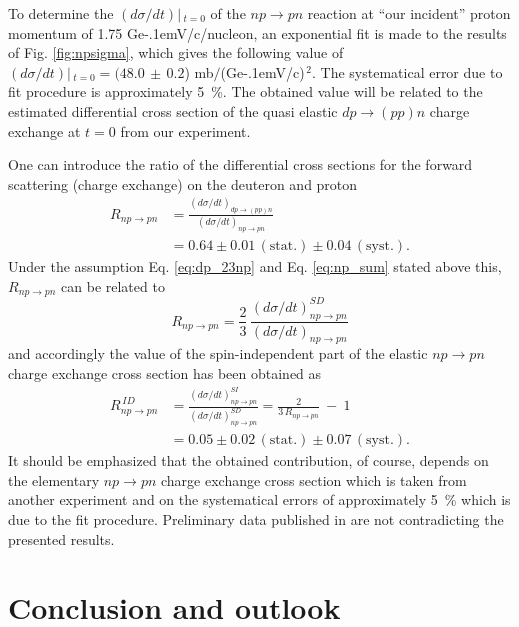 \documentclass[twocolumn,epjc3]{svjour3}
\newcommand{\np}     {\ensuremath{np \rightarrow pn}\xspace}
\newcommand{\dpchex} {\ensuremath{dp \rightarrow (pp)n}\xspace}
\newcommand{\GeVc}   {Ge\kern-.1emV/c\xspace}
\begin{document}
To determine the $(d\sigma/dt)|\,_{t=0}$ of the \np reaction at ``our incident''
proton momentum of 1.75 \GeVc/nucleon, an exponential fit is made to the results
of Fig. \ref{fig:npsigma}, which gives the following value of
$(d\sigma/dt)|\,_{t=0} = (48.0\,\pm\,0.2$) mb$/$(\GeVc)$^{\,2}$. The systematical
error due to fit procedure is approximately 5~\%. The obtained value will be
related to the estimated differential cross section of the quasi elastic \dpchex
charge exchange at $t=0$ from our experiment.

One can introduce the ratio of the differential cross sections for the forward
scattering (charge exchange) on the deuteron and proton
\begin{equation}
  \begin{split}
    R_{\np} &= \frac{(d\sigma/dt)_{\dpchex}}{(d\sigma/dt)_{\np}} \\
    &= 0.64 \pm 0.01\,\mathrm{(stat.)} \pm 0.04\,\mathrm{(syst.)}.
  \end{split}
\end{equation}
Under the assumption Eq. \eqref{eq:dp_23np} and Eq. \eqref{eq:np_sum} stated
above this, $R_{\np}$ can be related to
\begin{equation}
  R_{\np} = \frac{2}{3}\,\frac{(d\sigma/dt)^{SD}_{\np}}{(d\sigma/dt)_{\np}}
\end{equation}
and accordingly the value of the spin-independent part of the elastic \np charge
exchange cross section has been obtained as
\begin{equation}
  \begin{split}
    R^{\,ID}_{\np} &= \frac{(d\sigma/dt)^{SI}_{\np}}{(d\sigma/dt)^{SD}_{\np}}
    = \frac{2}{3\,R_{\np}} \ - \ 1 \\
    &= 0.05 \pm 0.02\,\mathrm{(stat.)} \pm 0.07\,\mathrm{(syst.)}.
  \end{split}
\end{equation}
It should be emphasized that the obtained contribution, of course, depends on
the elementary \np charge exchange cross section which is taken from another
experiment and on the systematical errors of approximately 5~\% which is due to
the fit procedure. Preliminary data published in \cite{bas14,bas16} are not
contradicting the presented results.


\section{Conclusion and outlook}
\end{document}
